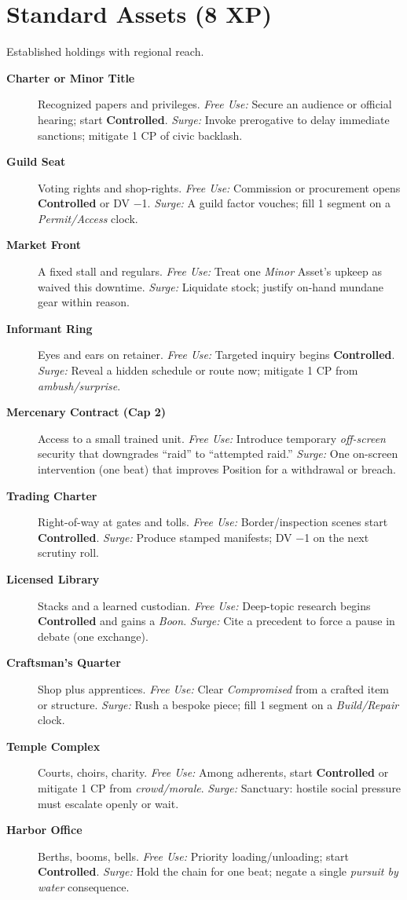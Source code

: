 \section{Standard Assets (8 XP)}
Established holdings with regional reach.
\begin{description}
  \item[\textbf{Charter or Minor Title}]  Recognized papers and privileges. \emph{Free Use:} Secure an audience or official hearing; start \textbf{Controlled}. \emph{Surge:} Invoke prerogative to delay immediate sanctions; mitigate 1 CP of civic backlash.
  \item[\textbf{Guild Seat}]  Voting rights and shop-rights. \emph{Free Use:} Commission or procurement opens \textbf{Controlled} or DV −1. \emph{Surge:} A guild factor vouches; fill 1 segment on a \emph{Permit/Access} clock.
  \item[\textbf{Market Front}]  A fixed stall and regulars. \emph{Free Use:} Treat one \emph{Minor} Asset’s upkeep as waived this downtime. \emph{Surge:} Liquidate stock; justify on-hand mundane gear within reason.
  \item[\textbf{Informant Ring}]  Eyes and ears on retainer. \emph{Free Use:} Targeted inquiry begins \textbf{Controlled}. \emph{Surge:} Reveal a hidden schedule or route now; mitigate 1 CP from \emph{ambush/surprise}.
  \item[\textbf{Mercenary Contract (Cap 2)}]  Access to a small trained unit. \emph{Free Use:} Introduce temporary \emph{off-screen} security that downgrades “raid” to “attempted raid.” \emph{Surge:} One on-screen intervention (one beat) that improves Position for a withdrawal or breach.
  \item[\textbf{Trading Charter}]  Right-of-way at gates and tolls. \emph{Free Use:} Border/inspection scenes start \textbf{Controlled}. \emph{Surge:} Produce stamped manifests; DV −1 on the next scrutiny roll.
  \item[\textbf{Licensed Library}]  Stacks and a learned custodian. \emph{Free Use:} Deep-topic research begins \textbf{Controlled} and gains a \emph{Boon}. \emph{Surge:} Cite a precedent to force a pause in debate (one exchange).
  \item[\textbf{Craftsman’s Quarter}]  Shop plus apprentices. \emph{Free Use:} Clear \emph{Compromised} from a crafted item or structure. \emph{Surge:} Rush a bespoke piece; fill 1 segment on a \emph{Build/Repair} clock.
  \item[\textbf{Temple Complex}]  Courts, choirs, charity. \emph{Free Use:} Among adherents, start \textbf{Controlled} or mitigate 1 CP from \emph{crowd/morale}. \emph{Surge:} Sanctuary: hostile social pressure must escalate openly or wait.
  \item[\textbf{Harbor Office}]  Berths, booms, bells. \emph{Free Use:} Priority loading/unloading; start \textbf{Controlled}. \emph{Surge:} Hold the chain for one beat; negate a single \emph{pursuit by water} consequence.
\end{description}

